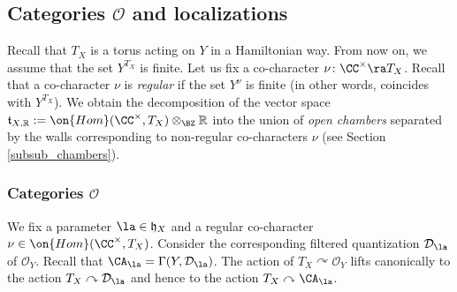 \documentclass[12pt]{amsart}
\newcommand{\CO}{\mathcal{O}}
\begin{document}




\subsection{Categories $\mathcal{O}$ and localizations}
	Recall that $T_X$ is a torus acting on $Y$
	in a Hamiltonian way. From now on, we assume that the set $Y^{T_X}$ is finite. 
	Let us fix a co-character $\nu\colon \CC^\times \ra T_X$.
	Recall that a co-character $\nu$ is {\em{regular}}
	if the set $Y^{\nu}$ is finite (in other words, coincides with $Y^{T_X}$).
	We obtain the decomposition of the vector space $\mathfrak{t}_{X,\mathbb{R}}:=\on{Hom}(\CC^\times,T_X)\otimes_{\BZ} \mathbb{R}$ into the union of {\em{open chambers}} separated by the walls corresponding to non-regular co-characters $\nu$ (see Section \ref{subsub_chambers}).
	
	\subsubsection{Categories $\CO$}\label{catOcat} We fix a parameter $\la \in \mathfrak{h}_{X}$ and a regular co-character $\nu \in \on{Hom}(\CC^{\times},T_X)$. Consider the corresponding filtered quantization $\mathcal{D}_\la$ of $\CO_{Y}$. Recall that $\CA_{\la}=\Gamma(Y,\mathcal{D}_\la)$.  The action of $T_X \curvearrowright \CO_{Y}$ lifts canonically to the action $T_X \curvearrowright \mathcal{D}_\la$ and hence to the action $T_X \curvearrowright \CA_{\la}$.
\end{document}
